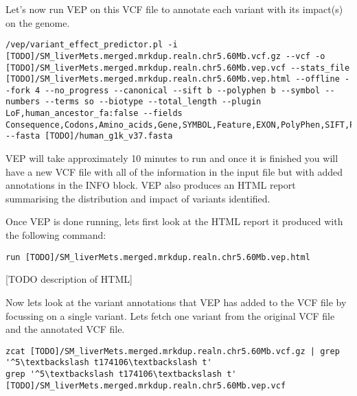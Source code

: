Let's now run VEP on this VCF file to annotate each variant with its impact(s) on the genome.

\begin{steps}
\begin{lstlisting}
/vep/variant_effect_predictor.pl -i [TODO]/SM_liverMets.merged.mrkdup.realn.chr5.60Mb.vcf.gz --vcf -o [TODO]/SM_liverMets.merged.mrkdup.realn.chr5.60Mb.vep.vcf --stats_file [TODO]/SM_liverMets.merged.mrkdup.realn.chr5.60Mb.vep.html --offline --fork 4 --no_progress --canonical --sift b --polyphen b --symbol --numbers --terms so --biotype --total_length --plugin LoF,human_ancestor_fa:false --fields Consequence,Codons,Amino_acids,Gene,SYMBOL,Feature,EXON,PolyPhen,SIFT,Protein_position,BIOTYPE,CANONICAL,Feature_type,cDNA_position,CDS_position,Existing_variation,DISTANCE,STRAND,CLIN_SIG,LoF_flags,LoF_filter,LoF,RadialSVM_score,RadialSVM_pred,LR_score,LR_pred,CADD_raw,CADD_phred,Reliability_index,HGVSc,HGVSp --fasta [TODO]/human_g1k_v37.fasta
\end{lstlisting}
\end{steps}

VEP will take approximately 10 minutes to run and once it is finished you will have a new VCF file with all of the information in the input file but with added annotations in the INFO block. VEP also produces an HTML report summarising the distribution and impact of variants identified.

\begin{steps}
Once VEP is done running, lets first look at the HTML report it produced with the following command:
\begin{lstlisting}
run [TODO]/SM_liverMets.merged.mrkdup.realn.chr5.60Mb.vep.html
\end{lstlisting}
\end{steps}

[TODO description of HTML]

\begin{steps}
Now lets look at the variant annotations that VEP has added to the VCF file by focussing on a single variant. Lets fetch one variant from the original VCF file and the annotated VCF file.
\begin{lstlisting}
zcat [TODO]/SM_liverMets.merged.mrkdup.realn.chr5.60Mb.vcf.gz | grep '^5\textbackslash t174106\textbackslash t'
grep '^5\textbackslash t174106\textbackslash t' [TODO]/SM_liverMets.merged.mrkdup.realn.chr5.60Mb.vep.vcf
\end{lstlisting}
\end{steps}

